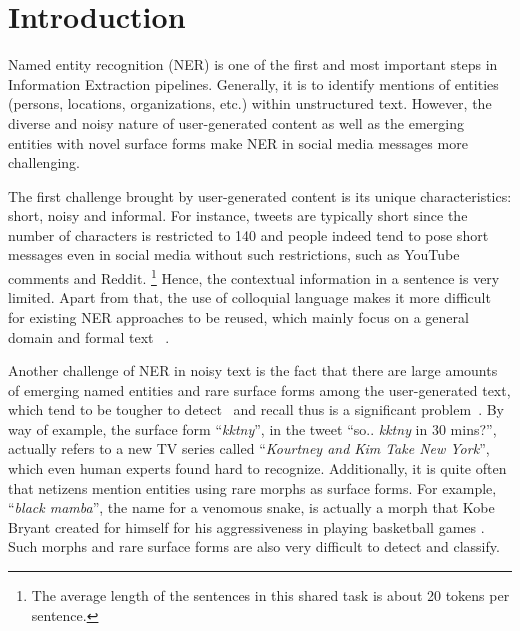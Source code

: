 \section{Introduction}
\label{sec:intro}
Named entity recognition (NER) is one of the first and most important steps in Information Extraction pipelines. 
Generally, it is to identify mentions of entities (persons, locations, organizations, etc.)
within unstructured text. 
However, the diverse and noisy nature of user-generated content as well as the emerging entities with novel surface forms make NER in social media messages more challenging.

The first challenge brought by user-generated content
is its unique characteristics: short, noisy and informal. 
For instance, tweets are typically short since the number of characters is restricted to 140 and people indeed tend to pose short messages even in social media without such restrictions, such as YouTube comments and Reddit.
\footnote{The average length of the sentences in this shared task is about 20 tokens per sentence.}
Hence, the contextual information in a sentence is very limited.
Apart from that, 
the use of colloquial language makes it more difficult for existing NER approaches to be reused, which mainly focus on a general domain and formal text ~\cite{baldwin2015shared, derczynski2015analysis}. 

Another challenge of NER in noisy text is the fact that there are large amounts of emerging named entities and rare surface forms among the user-generated text, which tend to be tougher to detect~\cite{augenstein2017generalisation} and recall thus is a significant problem~\cite{derczynski2015analysis}.
By way of example, the surface form ``\textit{kktny}'', in the tweet ``so.. \textit{kktny} in 30 mins?'',
actually refers to a new TV series called ``\textit{Kourtney and Kim Take New York}'', which even human experts found hard to recognize. 
Additionally, it is quite often that netizens mention entities using rare morphs as surface forms. 
For example, ``\textit{black mamba}'', the name for a venomous snake, is actually a morph that
Kobe Bryant created for himself for his aggressiveness in playing basketball
games \cite{DBLP:conf/acl/ZhangHPLLJKWSHY15}.
Such morphs and rare surface forms are also very difficult to detect and classify. 

